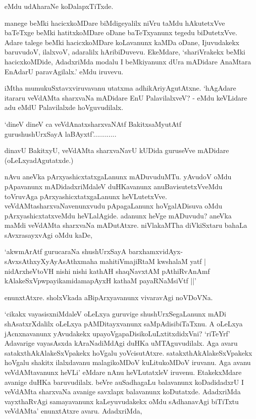 eMdu udAharaNe koDalapxTiTxde.

manege beMki hacicxkoMDare biMdigeyalilx niVru taMdu hAkutetxVve baTeTxge beMki hatitxkoMDare oDane baTeTxyanunx tegedu biDutetxVve. Adare talege beMki hacicxkoMDare koLavanunx kaMDa oDane, Ijuvudakekx baruvudoV, ilalxvoV, adaralilx hAribiDuvevu. EkeMdare, `shariVrakekx beMki hacicxkoMDide, AdadxriMda modalu I beMkiyanunx dUra mADidare AnaMtara EnAdarU paravAgilalx.' eMdu iruvevu.

iMtha mumukuSxtavxviruvavanu utatxma adhikAriyAgutAtxne. `hAgAdare itararu veVdAMta sharxvaNa mADidare EnU PalavilalxveV? - eMdu keVLidare adu eMdU Palavilalxde hoVguvudilalx.

\begin{shloka}
`dineV dineV ca veVdAnatxsharxvaNAtf BakitxsaMyutAtf\\
gurushushUrxSayA laBAyxtf'............
\end{shloka}

dinavU BakitxyU, veVdAMta sharxvaNavU kUDida guruseVve mADidare (oLeLxyadAgutatxde.)

nAvu aneVka pArxyashicxtatxgaLanunx mADuvuduMTu. yAvudoV oMdu pApavanunx mADidadxriMdaleV duHKavanunx anuBavisutetxVveMdu toVruvAga pArxyashicxtatxgaLanunx heVLutetxVve. veVdAMtasharxvaNavenunxvudu pApagaLanunx hoVgalADisuva oMdu pArxyashicxtatxveMdu heVLalAgide. adanunx heVge mADuvudu? aneVka maMdi veVdAMta sharxvaNa mADutAtxre. niVlakaMTha diVkiSxtaru bahaLa sAvxrasayxvAgi oMdu kaDe,

\begin{shloka}
`akwmArAtf gurucaraNa shushUrxSayA barxhamxvidAyx-\\
sAvxsAthxyXyAyAsAthxmaha mahitiVmajiRtaM kwshalaM yatf |\\
nidArxheVtoVH nishi nishi kathAH shaqNavxtAM pAthiRvAnAmf\\
kAlakeSxVpwpayikamidamapAyxH kathaM payaRNaMsiVtf ||'
\end{shloka}

enunxtAtxre. sholxVkada aBipArxyavanunx vivaravAgi noVDoVNa.

`cikakx vayasisxniMdaleV oLeLxya guruvige shushUrxSegaLanunx mADi shAsatxrXdalilx oLeLxya pAMDitayxvanunx saMpAdisibiTaTxnu. A oLeLxya jAcnxnavanunx yAvudakekx upayoVgapaDisikoLuLxtitxdidxVni? `riTeYrf' Adavarige vayasAsxda kAraNadiMdAgi duHKa uMTAguvudilalx. Aga avaru satakxthAkAlakeSxVpakekx hoVgalu yoVcisutAtxre. satakxthAkAlakeSxVpakekx hoVgalu shakitx ilalxdavanu malagikoMDoV kuLitukoMDoV iruvanu. Aga avanu veVdAMtavanunx heVLi' eMdare nAnu heVLutatxleV iruvenu. EtakekxMdare avanige duHKa baruvudilalx. beVre auSadhagaLu balavanunx koDadidadxrU I veVdAMta sharxvaNa avanige savxlapx balavanunx koDutatxde. AdadxriMda vayxthaRvAgi samayavanunx kaLeyuvudakekx oMdu sAdhanavAgi biTiTxtu veVdAMta' enunxtAtxre avaru. AdadxriMda,

